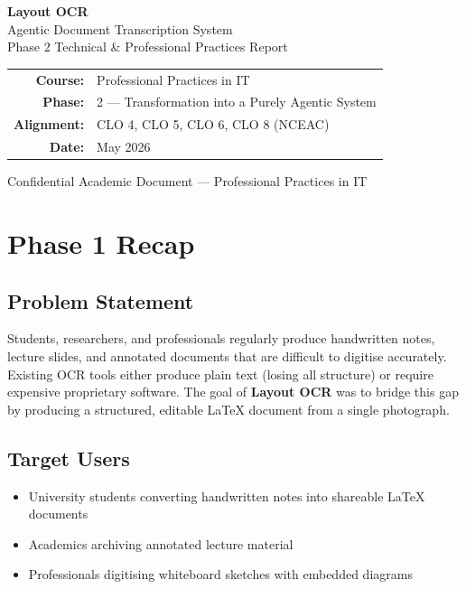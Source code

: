 \documentclass[12pt,a4paper]{article}
\begin{document}
\begin{titlepage}
  \centering
  \vspace*{2cm}
  {\Huge\bfseries\color{indigo} Layout OCR}\\[0.4cm]
  {\Large\color{slate} Agentic Document Transcription System}\\[0.2cm]
  {\large\color{slate} Phase 2 Technical \& Professional Practices Report}\\[3cm]

  \begin{tabular}{rl}
    \textbf{Course:}    & Professional Practices in IT \\[0.4em]
    \textbf{Phase:}     & 2 — Transformation into a Purely Agentic System \\[0.4em]
    \textbf{Alignment:} & CLO 4, CLO 5, CLO 6, CLO 8 (NCEAC) \\[0.4em]
    \textbf{Date:}      & May 2026 \\
  \end{tabular}

  \vfill
  {\small\color{slate} Confidential Academic Document — Professional Practices in IT}
\end{titlepage}

\newpage
\tableofcontents
\newpage


\section{Phase 1 Recap}

\subsection{Problem Statement}
Students, researchers, and professionals regularly produce handwritten notes, lecture slides, and
annotated documents that are difficult to digitise accurately. Existing OCR tools either produce
plain text (losing all structure) or require expensive proprietary software. The goal of
\textbf{Layout OCR} was to bridge this gap by producing a structured, editable
\LaTeX{} document from a single photograph.

\subsection{Target Users}
\begin{itemize}[noitemsep]
  \item University students converting handwritten notes into shareable \LaTeX{} documents
  \item Academics archiving annotated lecture material
  \item Professionals digitising whiteboard sketches with embedded diagrams
\end{itemize}
\end{document}
